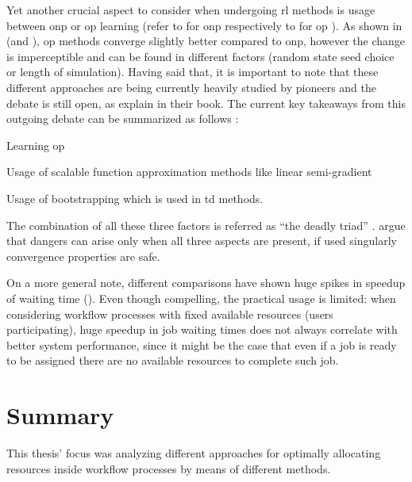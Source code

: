 Yet another crucial aspect to consider when undergoing \gls{rl} methods is usage between \gls{onp} or \gls{op} learning (refer to  for \gls{onp} respectively to  for \gls{op} ). As shown in  (and ), \gls{op} methods converge slightly better compared to \gls{onp}, however the change is imperceptible and can be found in different factors (\eg random state seed choice or length of simulation). Having said that, it is important to note that these different approaches are being currently heavily studied by pioneers and the debate is still open, as \citet[pp. 245--249]{Sutton2017} explain in their book. The current key takeaways from this outgoing debate can be summarized as follows \citep{Sutton2017}:
\begin{enumerate*}
	\item Learning \gls{op}
	\item Usage of scalable function approximation methods like linear semi-gradient 
	\item Usage of bootstrapping which is used in \gls{td} methods.
\end{enumerate*}

The combination of all these three factors is referred as ``the deadly triad'' \citep[p. 249]{Sutton2017}. \citet[p. 249]{Sutton2017} argue that dangers can arise only when all three aspects are present, if used singularly convergence properties are safe.

On a more general note, different comparisons have shown huge spikes in speedup of waiting time (\eg {}). Even though compelling, the practical usage is limited: when considering workflow processes with fixed available resources (\ie users participating), huge speedup in job waiting times does not always correlate with better system performance, since it might be the case that even if a job is ready to be assigned there are no available resources to complete such job.


\section{Summary}

This thesis' focus was analyzing different approaches for optimally allocating resources inside workflow processes by means of different methods.

